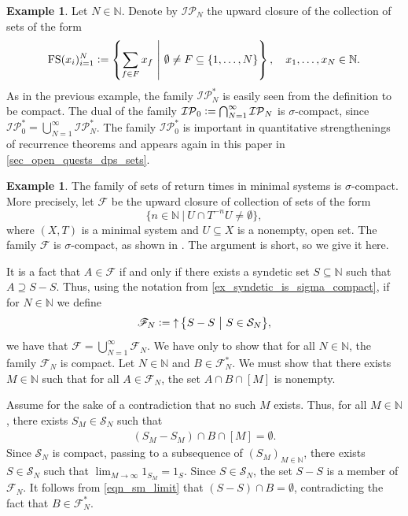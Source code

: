 \documentclass[letter,11pt]{article}
\theoremstyle{plain}
\theoremstyle{definition}
\newtheorem{example}[theorem]{Example}
\theoremstyle{plain}
\theoremstyle{plain}
\numberwithin{equation}{section}
\newcommand{\N}{\mathbb{N}}
\newcommand{\defeq}{\vcentcolon=}
\DeclareMathOperator{\upclose}{\uparrow}
\newcommand{\syndetic}{\mathcal{S}}
\newcommand{\IP}{\mathcal{IP}}
\newcommand{\class}{\mathscr{F}}
\newcommand{\FS}{\text{FS}}
\begin{document}
\begin{example}
\label{ex_ip_k_sets_are_compact}
    Let $N \in \N$. Denote by $\IP_N$ the upward closure of the collection of sets of the form
    \[\FS(x_i)_{i=1}^N \defeq \left\{ \sum_{f \in F} x_f \ \middle | \ \emptyset \neq F \subseteq \{1, \ldots, N\} \right\}, \quad x_1, \ldots, x_N \in \N.\]
    As in the previous example, the family $\IP_N^*$ is easily seen from the definition to be compact.  The dual of the family $\IP_0 \defeq \bigcap_{N = 1}^\infty \IP_N$ is $\sigma$-compact, since $\IP_0^* = \bigcup_{N=1}^\infty \IP_N^*$.  The family $\IP_0^*$ is important in quantitative strengthenings of recurrence theorems and appears again in this paper in \cref{sec_open_quests_dps_sets}.
\end{example}

\begin{example}
\label{example:set-topological-partition}
    The family of sets of return times in minimal systems is $\sigma$-compact. More precisely, let $\class$ be the upward closure of collection of sets of the form
    \begin{equation}\label{eq:sigma_compact_topological}
        \big\{n \in \N \ \big| \ U \cap T^{-n} U \neq \emptyset \big\},
    \end{equation}
    where $(X, T)$ is a minimal system and $U \subseteq X$ is a nonempty, open set. The family $\class$ is $\sigma$-compact, as shown in \cite[Prop. 5.8]{boshernitzan_glasner_2009}. The argument is short, so we give it here.
    
    It is a fact \cite[Thm. 2.4]{bergelson_mccutcheon_1998} that $A \in \class$ if and only if there exists a syndetic set $S \subseteq \N$ such that $A \supseteq S-S$. Thus, using the notation from \eqref{ex_syndetic_is_sigma_compact}, if for $N \in \N$ we define
    \[\class_N \defeq \upclose \big\{ S - S \ \big| \ S \in \syndetic_N \big\},\]
    we have that $\class = \bigcup_{N=1}^{\infty} \class_N$.  We have only to show that for all $N \in \N$, the family $\class_N$ is compact. Let $N \in \N$ and $B \in \class_N^*$.  We must show that there exists $M \in \N$ such that for all $A \in \class_N$, the set $A \cap B \cap [M]$ is nonempty.

    Assume for the sake of a contradiction that no such $M$ exists.  Thus, for all $M \in \N$, there exists $S_M \in \syndetic_N$ such that
    \begin{align}
    \label{eqn_sm_limit}
        (S_M - S_M) \cap B \cap [M] = \emptyset.
    \end{align}
    Since $\syndetic_N$ is compact, passing to a subsequence of $(S_M)_{M \in \N}$, there exists $S \in \syndetic_N$ such that $\lim_{M \to \infty} 1_{S_M} = 1_S$.  Since $S \in \syndetic_N$, the set $S-S$ is a member of $\class_N$.  It follows from \eqref{eqn_sm_limit} that $(S-S) \cap B = \emptyset$, contradicting the fact that $B \in \class_N^*$.
\end{example}
\end{document}
